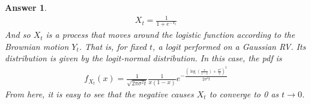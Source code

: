 \documentclass[12pt]{article}
\theoremstyle{colon}
\newtheorem*{answer}{Answer}
\begin{document}
\begin{answer}
  \begin{gather*}
    X_t = \frac{1}{1 + e^{-Y_t}}
  \end{gather*}
  And so $X_t$ is a process that moves around the logistic function according to the Brownian motion $Y_t$. That is, for fixed $t$, a logit performed on a Gaussian RV. Its distribution is given by the logit-normal distribution. In this case, the pdf is
  \begin{gather*}
    f_{X_t} (x) = \frac{1}{\sqrt{2 \pi \sigma^2 t}} \frac{1}{x(1-x)} e^{- \frac{(\log(\frac{x}{1-x}) + \frac{\sigma^2}{2})^2}{2 \sigma^2 t}}
  \end{gather*}
  From here, it is easy to see that the negative causes $X_t$ to converge to 0 as $t \rightarrow 0$.
\end{answer}
\end{document}
